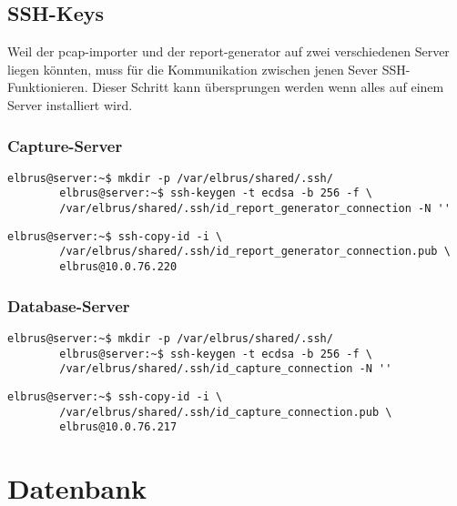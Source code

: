 \documentclass{article}
\begin{document}
	\newpage
	\subsection{SSH-Keys}
	
	Weil der pcap-importer und der report-generator auf zwei verschiedenen Server liegen könnten, muss für die Kommunikation zwischen jenen Sever SSH-Funktionieren.
	\newline\newline
	Dieser Schritt kann übersprungen werden wenn alles auf einem Server installiert wird.
	
	\subsubsection{Capture-Server}
	\begin{lstlisting}[caption={Anlegen der SSH-Keys.}]
		elbrus@server:~$ mkdir -p /var/elbrus/shared/.ssh/
		elbrus@server:~$ ssh-keygen -t ecdsa -b 256 -f \
		/var/elbrus/shared/.ssh/id_report_generator_connection -N ''
	\end{lstlisting}
	
	\begin{lstlisting}[caption={Übertragen der SSH-Keys auf den Database-Server.}]
		elbrus@server:~$ ssh-copy-id -i \
		/var/elbrus/shared/.ssh/id_report_generator_connection.pub \
		elbrus@10.0.76.220
	\end{lstlisting}
	
	\subsubsection{Database-Server}
	\begin{lstlisting}[caption={Anlegen der SSH-Keys.}]
		elbrus@server:~$ mkdir -p /var/elbrus/shared/.ssh/
		elbrus@server:~$ ssh-keygen -t ecdsa -b 256 -f \
		/var/elbrus/shared/.ssh/id_capture_connection -N ''
	\end{lstlisting}
	
	\begin{lstlisting}[caption={Übertragen der SSH-Keys auf den Capture-Server.}]
		elbrus@server:~$ ssh-copy-id -i \
		/var/elbrus/shared/.ssh/id_capture_connection.pub \
		elbrus@10.0.76.217
	\end{lstlisting}
	
	\newpage
	\section{Datenbank}
\end{document}
